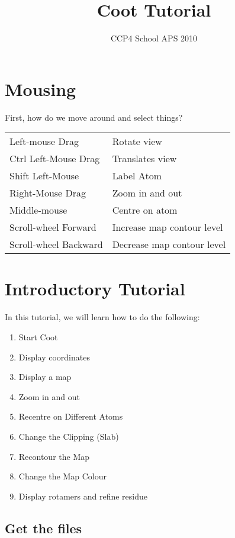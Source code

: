 \documentclass{article}
\title{Coot Tutorial}
\author{CCP4 School APS 2010}
\begin{document}
\maketitle
\tableofcontents


\newpage

\section{Mousing}

First, how do we move around and select things?

\vspace{0.5cm}
  \begin{tabular}{ll}
    Left-mouse Drag & Rotate view \\
    Ctrl Left-Mouse Drag &  Translates view \\
    Shift Left-Mouse &  Label Atom\\
    Right-Mouse Drag &  Zoom in and out\index{zoom}\\
    Middle-mouse & Centre on atom\\
    Scroll-wheel Forward &  Increase map contour level\\
    Scroll-wheel Backward &  Decrease map contour level
  \end{tabular}
\vspace{0.5cm}

\section{Introductory Tutorial}

In this tutorial, we will learn how to do the following:
\begin{enumerate}
\item Start Coot
\item Display coordinates
\item Display a map
\item Zoom in and out
\item Recentre on Different Atoms
\item Change the Clipping (Slab)
\item Recontour the Map
\item Change the Map Colour
\item Display rotamers and refine residue
\end{enumerate}

\subsection{Get the files}
\end{document}
